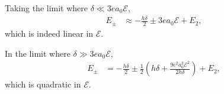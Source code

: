 \documentclass[
a4paper,
10pt,
twoside,
]{article}
\begin{document}
Taking the limit where $\delta\ll 3ea_0\mathcal{E}$,
\begin{align}
	E_\pm &\approx -\frac{h \delta}{2} \pm 3ea_0\mathcal{E} + E_2,
\end{align}
which is indeed linear in $\mathcal{E}$.

In the limit where $\delta\gg 3ea_0\mathcal{E}$,
\begin{align}
	E_\pm &= -\frac{h \delta}{2} \pm \frac{1}{2}\left(h\delta + \frac{9e^2a_0^2\mathcal{E}^2}{2h\delta}\right) + E_2,
\end{align}
which is quadratic in $\mathcal{E}$.

\stopmcols
\end{document}
